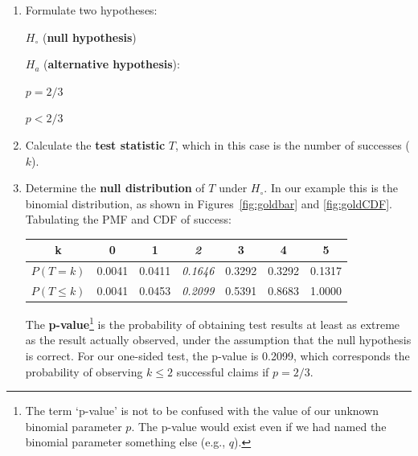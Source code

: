 \begin{enumerate}

\item Formulate two hypotheses:\medskip

\noindent\begin{minipage}{.4\textwidth}
  $H_\circ$ (\textbf{null hypothesis})
  
  \vspace{1em}
  
  $H_a$ (\textbf{alternative hypothesis}):
\end{minipage}
\begin{minipage}{.2\textwidth}
\end{minipage}
\begin{minipage}{.2\textwidth}
  $p={2/3}$
  
  \vspace{1em}
  
  $p<{2/3}$
\end{minipage}
\begin{minipage}{.2\textwidth}
\end{minipage}\medskip

\item Calculate the \textbf{test statistic} $T$, which in this case is
  the number of successes ($k$).

\item Determine the \textbf{null distribution} of $T$ under
  $H_\circ$. In our example this is the binomial distribution, as
  shown in Figures~\ref{fig:goldbar} and \ref{fig:goldCDF}. Tabulating
  the PMF and CDF of success:

  \begin{center}
  \begin{tabular}{ccccccc}
    k & 0 & 1 & \textit{2} & 3 & 4 & 5 \\ \hline
    $P(T=k)$ & 0.0041 & 0.0411 & \textit{0.1646} & 0.3292 & 0.3292 & 0.1317 \\
    $P({T}\leq{k})$ & 0.0041 & 0.0453 & \textit{0.2099} & 0.5391 & 0.8683 & 1.0000
  \end{tabular}
  \end{center}

The \textbf{p-value}\footnote{The term `p-value' is not to be confused
  with the value of our unknown binomial parameter $p$. The p-value
  would exist even if we had named the binomial parameter something
  else (e.g., $q$).} is the probability of obtaining test results at
least as extreme as the result actually observed, under the assumption
that the null hypothesis is correct. For our one-sided test, the
p-value is 0.2099, which corresponds the probability of observing
$k\leq{2}$ successful claims if $p=2/3$.
  

\end{enumerate}
